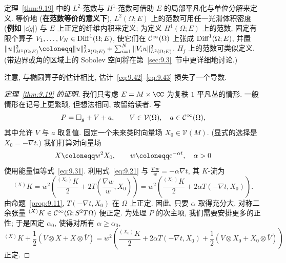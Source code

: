 定理~\ref{thm:9.19} 中的 $L^2$-范数与 $H^1$-范数可借助 $E$ 的局部平凡化与单位分解来定义. 等价地 (\textbf{在范数等价的意义下}), $L^2(\Omega; E)$ 上的范数可用任一光滑体积密度 (\textbf{例如} $|\dd g|$) 与 $E$ 上正定的纤维内积来定义; 为定义 $H^1(\Omega; E)$ 上的范数, 固定有限个算子 $V_1, \ldots, V_N \in \operatorname{Diff}^1(\Omega; E)$, 使它们在 $\mathcal{C}^\infty(\Omega)$ 上张成 $\operatorname{Diff}^1(\Omega; E)$, 并置 $\|u\|_{H^1(\Omega; E)}^2 \defeq \|u\|_{L^2(\Omega; E)}^2 + \sum_{i=1}^{N} \|V_i u\|_{L^2(\Omega; E)}^2$. $H_j$ 上的范数可类似定义. (带边界或角的区域上的 Sobolev 空间将在第~\ref{sec:9.3}~节中更详细地讨论.)

注意, 与椭圆算子的估计相比, 估计~\eqref{eq:9.42}--\eqref{eq:9.43} 损失了一个导数.

\begin{proof}[定理~\ref{thm:9.19} 的证明]
我们只考虑 $E = M \times \CC$ 为复秩 $1$ 平凡丛的情形. 一般情形在记号上更繁琐, 但想法相同, 故留给读者. 写
\begin{equation}\label{eq:9.44}
    P = \Box_g + V + a, \qquad V \in \mathcal{V}(\Omega), \quad a \in \mathcal{C}^\infty(\Omega),
\end{equation}
其中允许 $V$ 与 $a$ 取复值. 固定一个未来类时向量场 $X_0 \in \mathcal{V}(M)$. (显式的选择是 $X_0 = -\nabla t$.) 我们打算对向量场
\begin{equation}\label{eq:9.45}
    X \defeq w^2 X_0, \qquad w \defeq \ee^{-\alpha t}, \quad \alpha > 0
\end{equation}
使用能量恒等式~\eqref{eq:9.31}. 利用式~\eqref{eq:9.21} 与 $\frac{\nabla w}{w} = -\alpha \nabla t$, 其 $K$-流为
\begin{equation}\label{eq:9.46}
    {}^{(X)} K = w^2 \left( \frac{{}^{(X_0)} K}{2} + 2 T\left( \frac{\nabla w}{w}, X_0 \right) \right) = w^2 \left( \frac{{}^{(X_0)} K}{2} + 2\alpha T(-\nabla t, X_0) \right).
\end{equation}
由命题~\ref{prop:9.11}, $T(-\nabla t, X_0)$ 在 $\Omega$ 上正定. 因此, 只要 $\alpha$ 取得充分大, 对称二余张量 ${}^{(X)} K \in \mathcal{C}^\infty(\Omega; S^2 T \Omega)$ 便正定. 为处理 $P$ 的次主项, 我们需要安排更多的正性; 于是固定 $\alpha_0$, 使得对所有 $\alpha \ge \alpha_0$,
\begin{equation}\label{eq:9.47}
    {}^{(X)} K + \frac12 (V \otimes X + X \otimes \bar V) = w^2 \left( \frac{{}^{(X_0)} K}{2} + 2\alpha T(-\nabla t, X_0) + \frac12 (V \otimes X_0 + X_0 \otimes \bar V) \right)
\end{equation}
正定.


\end{proof}
